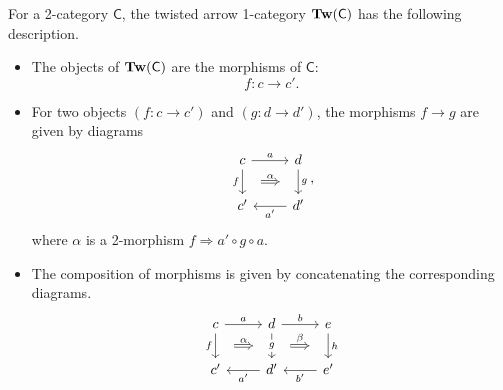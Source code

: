 \documentclass[main.tex]{subfiles}
\begin{document}
For a 2-category $\mathsf{C}$, the twisted arrow 1-category $\mathbf{Tw}(\mathsf{C})$ has the following description.
\begin{itemize}
  \item The objects of $\mathbf{Tw}(\mathsf{C})$ are the morphisms of $\mathsf{C}$:
    \begin{equation*}
      f\colon c \to c'.
    \end{equation*}

  \item For two objects $(f\colon c \to c')$ and $(g\colon d \to d')$, the morphisms $f \to g$ are given by diagrams
    \begin{equation*}
      \begin{tikzcd}
        c
        \arrow[r, "a"]
        \arrow[d, "f"{swap}, ""{name=L}]
        & d
        \arrow[d, "g", ""{name=R, swap}]
        \\
        c'
        & d'
        \arrow[l, "a'"]
        \arrow[from=L, to=R, Rightarrow, shorten=2ex, "\alpha"]
      \end{tikzcd},
    \end{equation*}
    where $\alpha$ is a 2-morphism $f \Rightarrow a' \circ g \circ a$.


  \item The composition of morphisms is given by concatenating the corresponding diagrams.
    \begin{equation*}
      \begin{tikzcd}
        c
        \arrow[r, "a"]
        \arrow[d, "f"{swap}, ""{name=L}]
        & d
        \arrow[d, "g"{description}, ""{name=LM}, ""{name=RM, swap}]
        \arrow[r, "b"]
        & e
        \arrow[d, "h", ""{name=R, swap}]
        \\
        c'
        & d'
        \arrow[l, "a'"]
        & e'
        \arrow[l, "b'"]
        \arrow[from=L, to=RM, Rightarrow, shorten=2ex, "\alpha"]
        \arrow[from=LM, to=R, Rightarrow, shorten=2ex, "\beta"]
      \end{tikzcd}
    \end{equation*}
\end{itemize}
\end{document}
